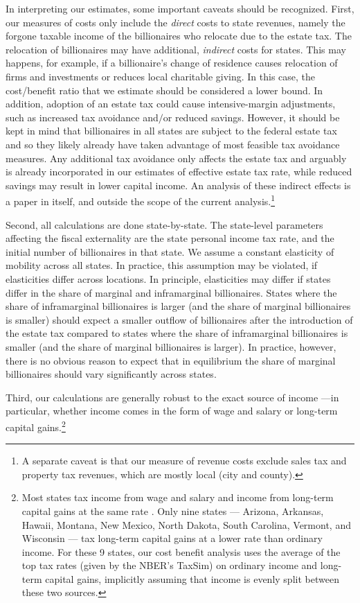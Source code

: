 \documentclass[12pt]{article}
\begin{document}
In interpreting our estimates, some important caveats should be recognized. 
First, our measures of costs only include the {\it direct} costs to state revenues, namely the forgone taxable income of the billionaires who relocate due to the estate tax. The relocation of billionaires may have additional, {\it indirect} costs for states. This may happens, for example, if a billionaire's change of residence causes relocation of firms and investments or reduces local charitable giving. In this case,  the cost/benefit ratio that we estimate should be considered a lower bound. In addition, adoption of an estate tax could cause intensive-margin adjustments, such as increased tax avoidance and$/$or reduced savings. However, it should be kept in mind that billionaires in all states are subject to the federal estate tax and so they likely already have taken advantage of most feasible tax avoidance measures. Any additional tax avoidance only affects the estate tax and arguably is already incorporated in our estimates of effective estate tax rate, while reduced savings may result in lower capital income. 
  An analysis of these indirect effects is a paper in itself, and outside the scope of the current analysis.\footnote{A separate caveat is that our measure of revenue costs exclude sales tax and property tax revenues, which are mostly local (city and county).}
  
 Second, all calculations are done state-by-state. The state-level parameters affecting the fiscal externality are the state personal income tax rate, and the initial number of billionaires in that state. We assume a constant elasticity of mobility across all states. In practice, this assumption may be violated, if elasticities differ  across locations. In principle, elasticities may differ if states differ in the share of marginal and inframarginal billionaires.  States where the share of inframarginal billionaires is larger (and the share of marginal billionaires is smaller) should expect a smaller outflow of billionaires after the introduction of the estate tax compared to states where the share of inframarginal billionaires is smaller (and the share of marginal billionaires is larger).  In practice, however, there is no obvious reason to expect that in equilibrium  the share of marginal billionaires should vary significantly across states.  
 
 Third, our calculations are generally robust to the exact source of income ---in particular, whether income comes in the form of wage and salary or long-term capital gains.\footnote{Most states tax income from wage and salary and income from long-term capital gains at the same rate \citep{xxc}. Only 
  nine states — Arizona, Arkansas, Hawaii, Montana, New Mexico, North Dakota, South Carolina, Vermont, and Wisconsin — tax long-term capital gains at a lower rate than ordinary income. For these 9 states, our cost benefit analysis uses the average of the top tax rates (given by the NBER's TaxSim) on ordinary income and long-term capital gains, implicitly assuming that income is evenly split between these two sources.}
 
\end{document}
